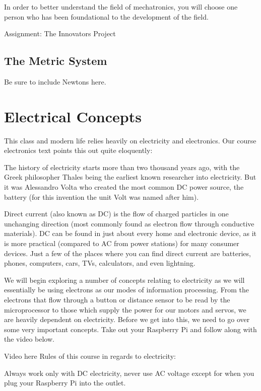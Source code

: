 \documentclass[
]{book}
\begin{document}
In order to better understand the field of mechatronics, you will choose one person who has been foundational to the development of the field.

Assignment: The Innovators Project

\hypertarget{the-metric-system}{%
\section{The Metric System}\label{the-metric-system}}

Be sure to include Newtons here.

\hypertarget{electrical-concepts}{%
\chapter{Electrical Concepts}\label{electrical-concepts}}

This class and modern life relies heavily on electricity and electronics. Our course electronics text points this out quite eloquently:

The history of electricity starts more than two thousand years ago, with the Greek philosopher Thales being the earliest known researcher into electricity. But it was Alessandro Volta who created the most common DC power source, the battery (for this invention the unit Volt was named after him).

Direct current (also known as DC) is the flow of charged particles in one unchanging direction (most commonly found as electron flow through conductive materials). DC can be found in just about every home and electronic device, as it is more practical (compared to AC from power stations) for many consumer devices. Just a few of the places where you can find direct current are batteries, phones, computers, cars, TVs, calculators, and even lightning.

We will begin exploring a number of concepts relating to electricity as we will essentially be using electrons as our modes of information processing. From the electrons that flow through a button or distance sensor to be read by the microprocessor to those which supply the power for our motors and servos, we are heavily dependent on electricity. Before we get into this, we need to go over some very important concepts. Take out your Raspberry Pi and follow along with the video below.

Video here
Rules of this course in regards to electricity:

Always work only with DC electricity, never use AC voltage except for when you plug your Raspberry Pi into the outlet.
\end{document}
